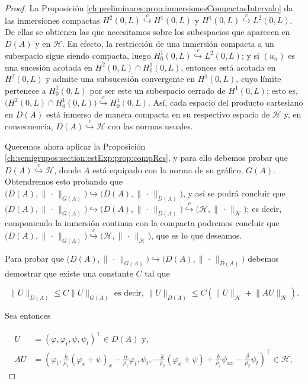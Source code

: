 \begin{proof}
    La Proposición \ref{ch:preliminares:prop:inmersionesCompactasIntervalo} da las inmersiones compactas $H^2(0,L) \overset{c}{\hookrightarrow} H^1(0,L)$ y $H^1(0,L) \overset{c}{\hookrightarrow} L^2(0,L)$. De ellas se obtienen las que necesitamos sobre los subespacios que aparecen en $D(A)$ y en $\mathcal{H}$. En efecto, la restricción de una inmersión compacta a un subespacio sigue siendo compacta, luego $H_0^1(0,L) \overset{c}{\hookrightarrow} L^2(0,L)$; y si $(u_n)$ es una sucesión acotada en $H^2(0,L) \cap H_0^1(0,L)$, entonces está acotada en $H^2(0,L)$ y admite una subsucesión convergente en $H^1(0,L)$, cuyo límite pertenece a $H_0^1(0,L)$ por ser este un subespacio cerrado de $H^1(0,L)$; esto es, $\big(H^2(0,L) \cap H^1_0(0,L)\big) \overset{c}{\hookrightarrow} H_0^1(0,L)$. Así, cada espacio del producto cartesiano en $D(A)$ está inmerso de manera compacta en su respectivo espacio de $\mathcal{H}$ y, en consecuencia, $D(A) \overset{c}{\hookrightarrow} \mathcal{H}$ con las normas usuales.

    Queremos ahora aplicar la Proposición \ref{ch:semigrupos:section:estExp:prop:compRes}, y para ello debemos probar que $D(A) \overset{c}{\hookrightarrow} \mathcal{H}$, donde $A$ está equipado con la norma de su gráfico, $G(A)$. Obtendremos esto probando que $\big(D(A), \lVert \, \cdot \, \rVert_{G(A)}\big) {\hookrightarrow} \big(D(A), \lVert \, \cdot \, \rVert_{D(A)}\big)$, y así se podrá concluir que $\big(D(A), \lVert \, \cdot \, \rVert_{G(A)}\big) {\hookrightarrow} \big(D(A), \lVert \, \cdot \, \rVert_{D(A)}\big) \overset{c}{\hookrightarrow} \big(\mathcal{H}, \lVert \, \cdot \, \rVert_{\mathcal{H}} \big)$; es decir, componiendo la inmersión continua con la compacta podremos concluir que $\big(D(A), \lVert \, \cdot \, \rVert_{G(A)}\big) \overset{c}{\hookrightarrow} \big(\mathcal{H}, \lVert \, \cdot \, \rVert_{\mathcal{H}}\big)$, que es lo que deseamos.

    Para probar que $\big(D(A), \lVert \, \cdot \, \rVert_{G(A)}\big) {\hookrightarrow} \big(D(A), \lVert \, \cdot \, \rVert_{D(A)}\big)$ debemos demostrar que existe una constante $C$ tal que

    \[\lVert U \rVert_{D(A)} \leq C\lVert U \rVert_{G(A)} \text{ es decir, } \lVert U \rVert_{D(A)} \leq C(\lVert U \rVert_{\mathcal{H}} + \lVert AU\rVert_{\mathcal{H}}).\]

    Sea entonces 
    
    \begin{align*}
        U &= (\varphi, \varphi_t, \psi, \psi_t)^\top \in D(A) \text{ y, }\\
        AU &= \left(\varphi_t, \frac{k}{\rho_1}(\varphi_x + \psi)_x - \frac{\alpha}{\rho_1}\varphi_t, \psi_t, -\frac{k}{\rho_2}(\varphi_x + \psi) + \frac{b}{\rho_2}\psi_{xx} - \frac{\beta}{\rho_2}\psi_t \right)^\top \in \mathcal{H},
    \end{align*}


\end{proof}
